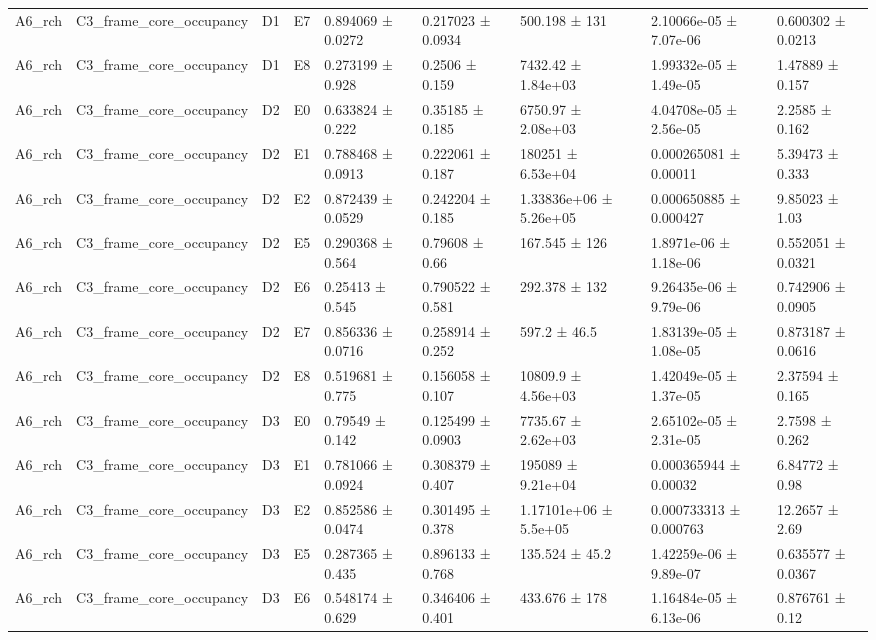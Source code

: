 \begin{table}
\begin{tabular}{lllllllll}
A6\_rch & C3\_frame\_core\_occupancy & D1 & E7 & 0.894069 ± 0.0272 & 0.217023 ± 0.0934 & 500.198 ± 131 & 2.10066e-05 ± 7.07e-06 & 0.600302 ± 0.0213 \\
A6\_rch & C3\_frame\_core\_occupancy & D1 & E8 & 0.273199 ± 0.928 & 0.2506 ± 0.159 & 7432.42 ± 1.84e+03 & 1.99332e-05 ± 1.49e-05 & 1.47889 ± 0.157 \\
A6\_rch & C3\_frame\_core\_occupancy & D2 & E0 & 0.633824 ± 0.222 & 0.35185 ± 0.185 & 6750.97 ± 2.08e+03 & 4.04708e-05 ± 2.56e-05 & 2.2585 ± 0.162 \\
A6\_rch & C3\_frame\_core\_occupancy & D2 & E1 & 0.788468 ± 0.0913 & 0.222061 ± 0.187 & 180251 ± 6.53e+04 & 0.000265081 ± 0.00011 & 5.39473 ± 0.333 \\
A6\_rch & C3\_frame\_core\_occupancy & D2 & E2 & 0.872439 ± 0.0529 & 0.242204 ± 0.185 & 1.33836e+06 ± 5.26e+05 & 0.000650885 ± 0.000427 & 9.85023 ± 1.03 \\
A6\_rch & C3\_frame\_core\_occupancy & D2 & E5 & 0.290368 ± 0.564 & 0.79608 ± 0.66 & 167.545 ± 126 & 1.8971e-06 ± 1.18e-06 & 0.552051 ± 0.0321 \\
A6\_rch & C3\_frame\_core\_occupancy & D2 & E6 & 0.25413 ± 0.545 & 0.790522 ± 0.581 & 292.378 ± 132 & 9.26435e-06 ± 9.79e-06 & 0.742906 ± 0.0905 \\
A6\_rch & C3\_frame\_core\_occupancy & D2 & E7 & 0.856336 ± 0.0716 & 0.258914 ± 0.252 & 597.2 ± 46.5 & 1.83139e-05 ± 1.08e-05 & 0.873187 ± 0.0616 \\
A6\_rch & C3\_frame\_core\_occupancy & D2 & E8 & 0.519681 ± 0.775 & 0.156058 ± 0.107 & 10809.9 ± 4.56e+03 & 1.42049e-05 ± 1.37e-05 & 2.37594 ± 0.165 \\
A6\_rch & C3\_frame\_core\_occupancy & D3 & E0 & 0.79549 ± 0.142 & 0.125499 ± 0.0903 & 7735.67 ± 2.62e+03 & 2.65102e-05 ± 2.31e-05 & 2.7598 ± 0.262 \\
A6\_rch & C3\_frame\_core\_occupancy & D3 & E1 & 0.781066 ± 0.0924 & 0.308379 ± 0.407 & 195089 ± 9.21e+04 & 0.000365944 ± 0.00032 & 6.84772 ± 0.98 \\
A6\_rch & C3\_frame\_core\_occupancy & D3 & E2 & 0.852586 ± 0.0474 & 0.301495 ± 0.378 & 1.17101e+06 ± 5.5e+05 & 0.000733313 ± 0.000763 & 12.2657 ± 2.69 \\
A6\_rch & C3\_frame\_core\_occupancy & D3 & E5 & 0.287365 ± 0.435 & 0.896133 ± 0.768 & 135.524 ± 45.2 & 1.42259e-06 ± 9.89e-07 & 0.635577 ± 0.0367 \\
A6\_rch & C3\_frame\_core\_occupancy & D3 & E6 & 0.548174 ± 0.629 & 0.346406 ± 0.401 & 433.676 ± 178 & 1.16484e-05 ± 6.13e-06 & 0.876761 ± 0.12 \\

\end{tabular}
\end{table}
